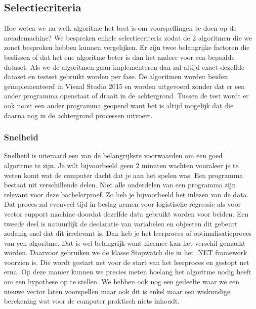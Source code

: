 \subsection{Selectiecriteria}
\label{sec:Selectiecriteria}
Hoe weten we nu welk algoritme het best is om voorspellingen te doen op de arcademachine? We bespreken enkele selectiecriteria zodat de 2 algoritmen die we zonet besproken hebben kunnen vergelijken. 
Er zijn twee belangrijke factoren die beslissen of dat het ene algoritme beter is dan het andere voor een bepaalde dataset. 
Als we de algoritmen gaan implementeren dan zal altijd exact dezelfde dataset en testset gebruikt worden per fase. De algoritmen worden beiden geïmplementeerd in Visual Studio 2015 en worden uitgevoerd zonder dat er een ander programma openstaat of draait in de achtergrond. Tussen de test wordt er ook nooit een ander programma geopend want het is altijd mogelijk dat die daarna nog in de achtergrond processen uitvoert. 

\subsubsection{Snelheid}
Snelheid is uiteraard een van de belangrijkste voorwaarden om een goed algoritme te zijn. Je wilt bijvoorbeeld geen 2 minuten wachten vooraleer je te weten komt wat de computer dacht dat je aan het spelen was. Een programma bestaat uit verschillende delen. Niet alle onderdelen van een programma zijn relevant voor deze bachelorproef. Zo heb je bijvoorbeeld het inlezen van de data. Dat proces zal evenveel tijd in beslag nemen voor logistische regressie als voor vector support machine doordat dezelfde data gebruikt worden voor beiden. Een tweede deel is natuurlijk de declaratie van variabelen en objecten dit gebeurt zodanig snel dat dit irrelevant is.\newline
Dan heb je het leerproces of optimalisatieproces van een algoritme. Dat is wel belangrijk want hiermee kan het verschil gemaakt worden. Daarvoor gebruiken we de klasse Stopwatch die in het .NET framework voorzien is. Die wordt gestart net voor de start van het leerproces en gestopt net erna. Op deze manier kunnen we precies meten hoelang het algoritme nodig heeft om een hypothese op te stellen. \newline
We hebben ook nog een gedeelte waar we een nieuwe vector laten voorspellen maar ook dit is enkel maar een wiskundige berekening wat voor de computer praktisch niets inhoudt. 

